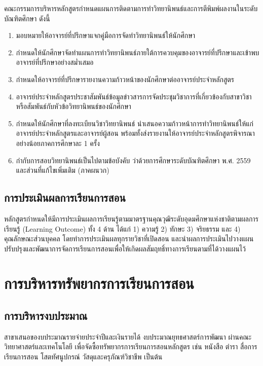  คณะกรรมการบริหารหลักสูตรกำหนดแผนการติดตามการทำวิทยานิพนธ์และการตีพิมพ์ผลงานในระดับบัณฑิตศึกษา ดังนี้ 

 \begin{enumerate}
   	\item มอบหมายให้อาจารย์ที่ปรึกษาแจกคู่มือการจัดทำวิทยานิพนธ์ให้นักศึกษา   
   	\item กำหนดให้นักศึกษาจัดทำแผนการทำวิทยานิพนธ์ภายใต้การควบคุมของอาจารย์ที่ปรึกษาและเข้าพบอาจารย์ที่ปรึกษาอย่างสม่ำเสมอ
   	\item กำหนดให้อาจารย์ที่ปรึกษารายงานความก้าวหน้าของนักศึกษาต่ออาจารย์ประจำหลักสูตร  	  
   	\item อาจารย์ประจำหลักสูตรประชาสัมพันธ์ข้อมูลข่าวสารการจัดประชุมวิชาการที่เกี่ยวข้องกับสาขาวิชาหรือสัมพันธ์กับหัวข้อวิทยานิพนธ์ของนักศึกษา
   	\item กำหนดให้นักศึกษาที่ลงทะเบียนวิชาวิทยานิพนธ์ นำเสนอความก้าวหน้าการทำวิทยานิพนธ์ให้แก่อาจารย์ประจำหลักสูตรและอาจารย์ผู้สอน พร้อมทั้งส่งรายงานให้อาจารย์ประจำหลักสูตรพิจารณาอย่างน้อยภาคการศึกษาละ 1 ครั้ง  	
   	\item  กำกับการสอบวิทยานิพนธ์เป็นไปตามข้อบังคับ\university{} ว่าด้วยการศึกษาระดับบัณฑิตศึกษา พ.ศ. 2559 และส่วนที่แก้ไขเพิ่มเติม (ภาคผนวก)   	
   	 \end{enumerate}


\subsection{การประเมินผลการเรียนการสอน}
หลักสูตรกำหนดให้มีการประเมินผลการเรียนรู้ตามมาตรฐานคุณวุฒิระดับอุดมศึกษาแห่งชาติตามผลการเรียนรู้ (Learning Outcome) ทั้ง 4 ด้าน ได้แก่ 1) ความรู้ 2) ทักษะ 3) จริยธรรม และ 4) คุณลักษณะส่วนบุคคล โดยทำการประเมินผลทุกรายวิชาที่เปิดสอน และนำผลการประเมินไปวางแผนปรับปรุงและพัฒนาการจัดการเรียนการสอนเพื่อให้เกิดผลสัมฤทธิ์ทางการเรียนตามที่ได้วางแผนไว้

\section{การบริหารทรัพยากรการเรียนการสอน}
\subsection{การบริหารงบประมาณ}
สาขา\thdegreebranch เสนอของบประมาณรายจ่ายประจำปีและเงินรายได้ งบประมาณยุทธศาสตร์การพัฒนา\university{} ผ่านคณะวิทยาศาสตร์และเทคโนโลยี เพื่อจัดซื้อทรัพยากรการเรียนการสอนหลักสูตร\thdegree{} เช่น หนังสือ ตำรา สื่อการเรียนการสอน โสตทัศนูปกรณ์ วัสดุและครุภัณฑ์วิชาชีพ เป็นต้น

